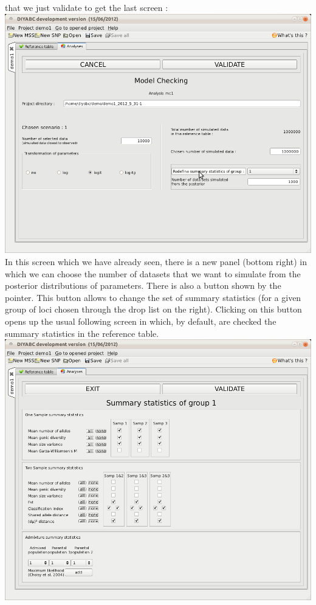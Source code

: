that we just validate to get the last screen :\\

\includegraphics[scale=0.35]{gui_pictures/Capture-DIYABC-55.png} \\

In this screen which we have already seen, there is a new panel (bottom right) in which we can choose the number of datasets that we want to simulate from the posterior distributions of parameters. There is also a button   shown by the pointer. This button allows to change the set of summary statistics (for a given group of loci chosen through the drop list on the right). Clicking on this button opens up the usual following screen in which, by default, are checked the summary statistics in the reference table.\\

\includegraphics[scale=0.35]{gui_pictures/Capture-DIYABC-56.png} \\

